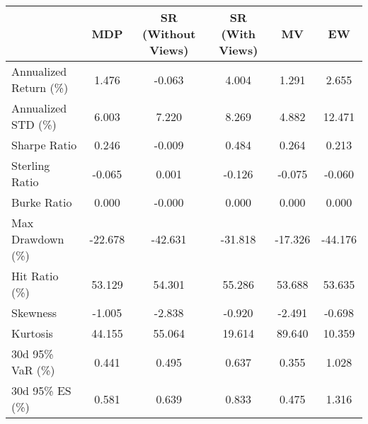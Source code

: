 \begin{tabular}{lccccc}
\toprule
{} &     MDP &  SR (Without Views) &  SR (With Views) &      MV &      EW \\
\midrule
Annualized Return (\%) &   1.476 &              -0.063 &            4.004 &   1.291 &   2.655 \\
Annualized STD (\%)    &   6.003 &               7.220 &            8.269 &   4.882 &  12.471 \\
Sharpe Ratio          &   0.246 &              -0.009 &            0.484 &   0.264 &   0.213 \\
Sterling Ratio        &  -0.065 &               0.001 &           -0.126 &  -0.075 &  -0.060 \\
Burke Ratio           &   0.000 &              -0.000 &            0.000 &   0.000 &   0.000 \\
Max Drawdown (\%)      & -22.678 &             -42.631 &          -31.818 & -17.326 & -44.176 \\
Hit Ratio (\%)         &  53.129 &              54.301 &           55.286 &  53.688 &  53.635 \\
Skewness              &  -1.005 &              -2.838 &           -0.920 &  -2.491 &  -0.698 \\
Kurtosis              &  44.155 &              55.064 &           19.614 &  89.640 &  10.359 \\
30d 95\% VaR (\%)       &   0.441 &               0.495 &            0.637 &   0.355 &   1.028 \\
30d 95\% ES (\%)        &   0.581 &               0.639 &            0.833 &   0.475 &   1.316 \\
\bottomrule
\end{tabular}
